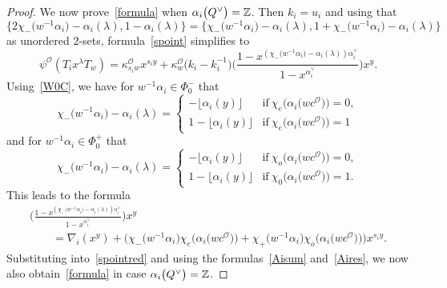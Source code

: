 \documentclass[pdftex]{sigma}
\numberwithin{equation}{section}
\begin{document}
\begin{proof}
We now prove~\eqref{formula} when $\alpha_i\smash{\bigl(Q^\vee\bigr)}=\mathbb{Z}$. Then $k_i=u_i$ and using that
\[
\bigl\{2\chi_-\bigl(w^{-1}\alpha_i\bigr)-\alpha_i(\lambda), 1-\alpha_i(\lambda)\bigr\}=\bigl\{\chi_-\bigl(w^{-1}\alpha_i\bigr)-\alpha_i(\lambda),1+\chi_-\bigl(w^{-1}\alpha_i\bigr)-\alpha_i(\lambda)\bigr\}
\]
as unordered $2$-sets,
formula~\eqref{spoint} simplifies to
\begin{equation}\label{spointred}
\psi^\mathcal{O}(T_ix^\lambda T_w)=\kappa_{s_iw}^\mathcal{O}x^{s_iy}
+\kappa_w^\mathcal{O}\bigl(k_i-k_i^{-1}\bigr)\Biggl(\frac{1-x^{(\chi_-\bigl(w^{-1}\alpha_i\bigr)-\alpha_i(\lambda))\alpha_i^\vee}}{1-x^{\alpha_i^\vee}}\Biggr)x^{y}.
\end{equation}
Using~\eqref{W0C}, we have for $w^{-1}\alpha_i\in\Phi_0^-$ that
\begin{equation*}
\chi_-\bigl(w^{-1}\alpha_i\bigr)-\alpha_i(\lambda)=
\begin{cases}
-\lfloor\alpha_i(y)\rfloor &\text{if}\ \chi_e\bigl(\alpha_i\bigl(wc^\mathcal{O}\bigr)\bigr)=0,\\
1-\lfloor\alpha_i(y)\rfloor &\text{if}\ \chi_e\bigl(\alpha_i\bigl(wc^\mathcal{O}\bigr)\bigr)=1
\end{cases}
\end{equation*}
and for $w^{-1}\alpha_i\in\Phi_0^+$ that
\begin{equation*}
\chi_-\bigl(w^{-1}\alpha_i\bigr)-\alpha_i(\lambda)=
\begin{cases}
-\lfloor\alpha_i(y)\rfloor &\text{if}\ \chi_o\bigl(\alpha_i\bigl(wc^\mathcal{O}\bigr)\bigr)=0,\\
1-\lfloor\alpha_i(y)\rfloor &\text{if}\ \chi_0\bigl(\alpha_i\bigl(wc^\mathcal{O}\bigr)\bigr)=1.
\end{cases}
\end{equation*}
This leads to the formula
\begin{gather*}
\Biggl(\frac{1-x^{(\chi_-\bigl(w^{-1}\alpha_i\bigr)-\alpha_i(\lambda))\alpha_i^\vee}}{1-x^{\alpha_i^\vee}}\Biggr)x^{y}\\
\qquad{}{}=
\nabla_i(x^y)+\bigl(\chi_-\bigl(w^{-1}\alpha_i\bigr)\chi_e\bigl(\alpha_i\bigl(wc^\mathcal{O}\bigr)\bigr)+\chi_+\bigl(w^{-1}\alpha_i\bigr)\chi_o\bigl(\alpha_i\bigl(wc^\mathcal{O}\bigr)\bigr)\bigr)x^{s_iy}.
\end{gather*}
Substituting into~\eqref{spointred} and using the formulas~\eqref{Aisum} and~\eqref{Aires}, we now also obtain~\eqref{formula} in case $\alpha_i\smash{\bigl(Q^\vee\bigr)}=\mathbb{Z}$.



\end{proof}
\end{document}
